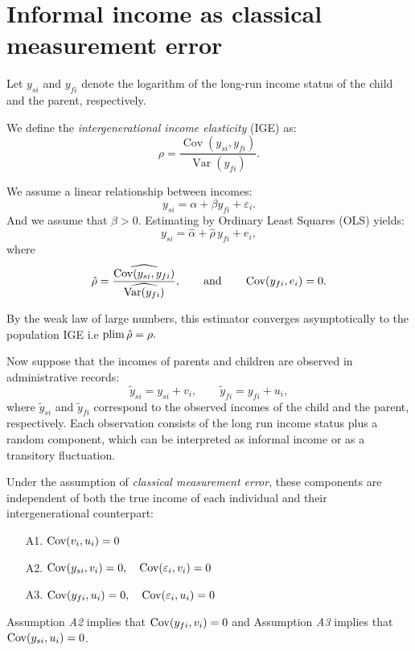 
\section{Informal income as classical measurement error}
Let $y_{si}$ and $y_{fi}$ denote the logarithm of the long-run income status of the child and the parent, respectively.

We define the \textit{intergenerational income elasticity} (IGE) as:
\[
\rho = \frac{\operatorname{Cov}(y_{si},y_{fi})}{\operatorname{Var}(y_{fi})}.
\]

We assume a linear relationship between incomes:
\[
y_{si} = \alpha + \beta y_{fi} + \varepsilon_{i}.
\]
And we assume that $\beta>0$.
Estimating by Ordinary Least Squares (OLS) yields:
\[
y_{si} = \hat{\alpha} + \hat{\rho}\, y_{fi} + e_i,
\]
where
\[
\hat{\rho} = \frac{\widehat{\operatorname{Cov}(y_{si},y_{fi})}}{\widehat{\operatorname{Var}(y_{fi})}},
\qquad \text{and} \qquad \operatorname{Cov}(y_{fi},e_i) = 0.
\]

By the weak law of large numbers, this estimator converges asymptotically to the population IGE i.e $\operatorname*{plim} \hat{\rho} = \rho.$



Now suppose that the incomes of parents and children are observed in administrative records:
\[
\tilde{y}_{si} = y_{si}+ v_i, \qquad
\tilde{y}_{fi}= y_{fi} + u_i,
\]
where $\tilde{y}_{si}$ and $\tilde{y}_{fi}$ correspond to the observed incomes of the child and the parent, respectively.  
Each observation consists of the long run income status plus a random component, which can be interpreted as informal income or as a transitory fluctuation.


\begin{assumption}
Under the assumption of \textit{classical measurement error}, these components are independent of both the true income of each individual and their intergenerational counterpart:
\begin{itemize}
    \item[A1.] $\operatorname{Cov}(v_i,u_i) = 0$
    \item[A2.] $\operatorname{Cov}(y_{si},v_i) = 0, \quad \operatorname{Cov}(\varepsilon_i,v_i)=0$
    \item[A3.] $\operatorname{Cov}(y_{fi},u_i) = 0, \quad \operatorname{Cov}(\varepsilon_i,u_i)=0$
\end{itemize}
\end{assumption}

Assumption \emph{A2} implies that $\operatorname{Cov}(y_{fi},v_i)=0$ and Assumption \emph{A3} implies that $\operatorname{Cov}(y_{si},u_i)=0$.

